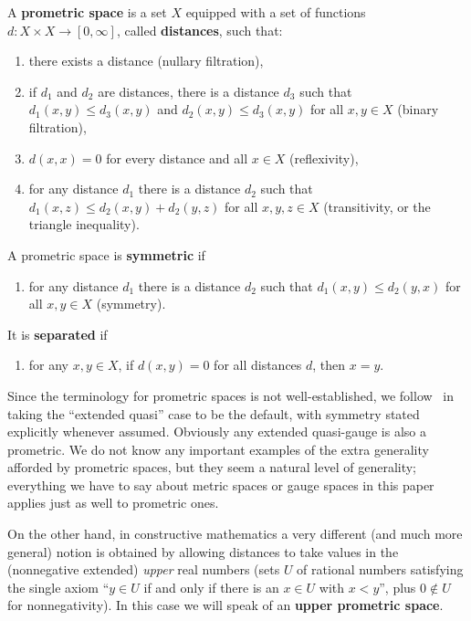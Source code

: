 \documentclass{article}
\def\Rp{[0,\infty]}
\begin{document}
\begin{defn}
  A \textbf{prometric space} is a set $X$ equipped with a set of functions $d:X\times X\to\Rp$, called \textbf{distances}, such that:
  \begin{enumerate}
  \item there exists a distance (nullary filtration),
  \item if $d_1$ and $d_2$ are distances, there is a distance $d_3$ such that $d_1(x,y)\le d_3(x,y)$ and $d_2(x,y)\le d_3(x,y)$ for all $x,y\in X$ (binary filtration),
  \item $d(x,x)=0$ for every distance and all $x\in X$ (reflexivity),
  \item for any distance $d_1$ there is a distance $d_2$ such that $d_1(x,z)\le d_2(x,y)+d_2(y,z)$ for all $x,y,z\in X$ (transitivity, or the triangle inequality).
  \end{enumerate}
  A prometric space is \textbf{symmetric} if
  \begin{enumerate}[resume]
  \item for any distance $d_1$ there is a distance $d_2$ such that $d_1(x,y)\le d_2(y,x)$ for all $x,y\in X$ (symmetry).
  \end{enumerate}
  It is \textbf{separated} if
  \begin{enumerate}[resume]
  \item for any $x,y\in X$, if $d(x,y)=0$ for all distances $d$, then $x=y$.
  \end{enumerate}
\end{defn}

Since the terminology for prometric spaces is not well-established, we follow~\cite{cht:one-setting} in taking the ``extended quasi'' case to be the default, with symmetry stated explicitly whenever assumed.
Obviously any extended quasi-gauge is also a prometric.
We do not know any important examples of the extra generality afforded by prometric spaces, but they seem a natural level of generality; everything we have to say about metric spaces or gauge spaces in this paper applies just as well to prometric ones.

On the other hand, in constructive mathematics a very different (and much more general) notion is obtained by allowing distances to take values in the (nonnegative extended) \emph{upper} real numbers (sets $U$ of rational numbers satisfying the single axiom ``$y\in U$ if and only if there is an $x\in U$ with $x<y$'', plus $0\notin U$ for nonnegativity).
In this case we will speak of an \textbf{upper prometric space}.
\end{document}
